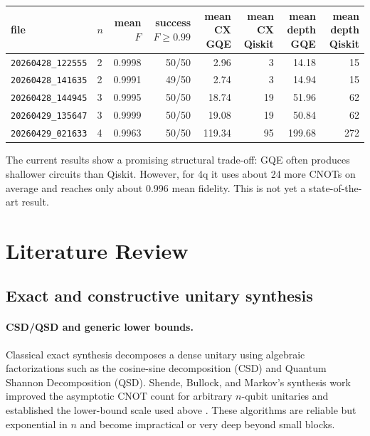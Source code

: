 \documentclass[11pt,a4paper]{article}
\begin{document}
\begin{center}
\small
\begin{tabular}{llrrrrrr}
\toprule
file & $n$ & mean $F$ & success $F\ge0.99$ & mean CX GQE & mean CX Qiskit & mean depth GQE & mean depth Qiskit \\
\midrule
\texttt{20260428\_122555} & 2 & 0.9998 & 50/50 & 2.96 & 3  & 14.18  & 15 \\
\texttt{20260428\_141635} & 2 & 0.9991 & 49/50 & 2.74 & 3  & 14.94  & 15 \\
\texttt{20260428\_144945} & 3 & 0.9995 & 50/50 & 18.74 & 19 & 51.96  & 62 \\
\texttt{20260429\_135647} & 3 & 0.9999 & 50/50 & 19.08 & 19 & 50.84  & 62 \\
\texttt{20260429\_021633} & 4 & 0.9963 & 50/50 & 119.34 & 95 & 199.68 & 272 \\
\bottomrule
\end{tabular}
\end{center}

The current results show a promising structural trade-off: GQE often produces
shallower circuits than Qiskit. However, for 4q it uses about 24 more CNOTs on
average and reaches only about 0.996 mean fidelity. This is not yet a
state-of-the-art result.

\section{Literature Review}

\subsection{Exact and constructive unitary synthesis}

\paragraph{CSD/QSD and generic lower bounds.}
Classical exact synthesis decomposes a dense unitary using algebraic
factorizations such as the cosine-sine decomposition (CSD) and Quantum
Shannon Decomposition (QSD). Shende, Bullock, and Markov's synthesis work
improved the asymptotic CNOT count for arbitrary $n$-qubit unitaries and
established the lower-bound scale used above \cite{shende2006synthesis}.
These algorithms are reliable but exponential in $n$ and become impractical
or very deep beyond small blocks.
\end{document}

